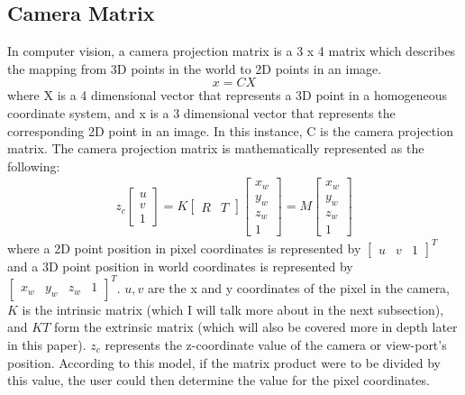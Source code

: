 \documentclass[10pt,twocolumn]{article}
\begin{document}
\subsection{Camera Matrix}
In computer vision, a camera projection matrix is a 3 x 4 matrix which describes the mapping from 3D points in the world to 2D points in an image. \[ x = CX \] where X is a 4 dimensional vector that represents a 3D point in a homogeneous coordinate system, and x is a 3 dimensional vector that represents the corresponding 2D point in an image. In this instance, C is the camera projection matrix. The camera projection matrix is mathematically represented as the following:
\begin{gather}
z_{c}
\begin{bmatrix}u\\v\\1\end{bmatrix}
=K
\begin{bmatrix}R&T\end{bmatrix}
\begin{bmatrix}x_{w}\\y_{w}\\z_{w}\\1\end{bmatrix}
=M
\begin{bmatrix}x_{w}\\y_{w}\\z_{w}\\1\end{bmatrix}
\end{gather} where a 2D point position in pixel coordinates is represented by  \begin{math}\begin{bmatrix}u&v&1\end{bmatrix}^T\end{math} and a 3D point position in world coordinates is represented by \begin{math}\begin{bmatrix}x_{w}&y_{w}&z_{w}&1\end{bmatrix}^T\end{math}. \begin{math}u, v\end{math} are the x and y coordinates of the pixel in the camera, \begin{math}K\end{math} is the intrinsic matrix (which I will talk more about in the next subsection), and \begin{math}K T\end{math} form the extrinsic matrix (which will also be covered more in depth later in this paper). \begin{math}z_{c}\end{math} represents the z-coordinate value of the camera or view-port's position. According to this model, if the matrix product were to be divided by this value, the user could then determine the value for the pixel coordinates.
\end{document}
